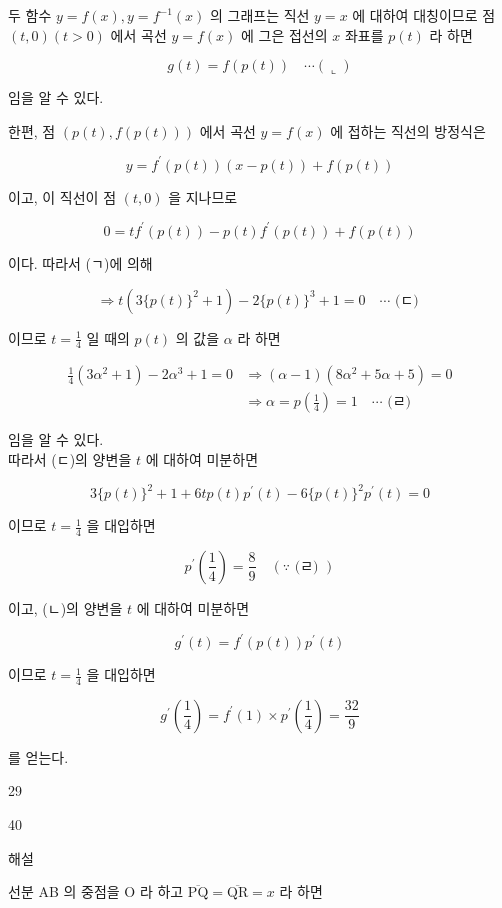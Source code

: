 \documentclass[10pt]{article}
\begin{document}
두 함수 \(y=f(x), y=f^{-1}(x)\) 의 그래프는 직선 \(y=x\) 에 대하여 대칭이므로 점 \((t, 0)(t>0)\) 에서 곡선 \(y=f(x)\) 에 그은 접선의 \(x\) 좌표를 \(p(t)\) 라 하면

\[
g(t)=f(p(t)) \quad \cdots(\llcorner)
\]

임을 알 수 있다.

한편, 점 \((p(t), f(p(t)))\) 에서 곡선 \(y=f(x)\) 에 접하는 직선의 방정식은

\[
y=f^{\prime}(p(t))(x-p(t))+f(p(t))
\]

이고, 이 직선이 점 \((t, 0)\) 을 지나므로

\[
0=t f^{\prime}(p(t))-p(t) f^{\prime}(p(t))+f(p(t))
\]

이다. 따라서 (ㄱ)에 의해

\[
\Rightarrow t\left(3\{p(t)\}^{2}+1\right)-2\{p(t)\}^{3}+1=0 \quad \cdots \text { (ㄷ) }
\]

이므로 \(t=\frac{1}{4}\) 일 때의 \(p(t)\) 의 값을 \(\alpha\) 라 하면

\[
\begin{aligned}
\frac{1}{4}\left(3 \alpha^{2}+1\right)-2 \alpha^{3}+1=0 & \Rightarrow(\alpha-1)\left(8 \alpha^{2}+5 \alpha+5\right)=0 \\
& \Rightarrow \alpha=p\left(\frac{1}{4}\right)=1 \quad \cdots \text { (ㄹ) }
\end{aligned}
\]

임을 알 수 있다.\\
따라서 (ㄷ)의 양변을 \(t\) 에 대하여 미분하면

\[
3\{p(t)\}^{2}+1+6 t p(t) p^{\prime}(t)-6\{p(t)\}^{2} p^{\prime}(t)=0
\]

이므로 \(t=\frac{1}{4}\) 을 대입하면

\[
p^{\prime}\left(\frac{1}{4}\right)=\frac{8}{9} \quad(\because \text { (ㄹ) })
\]

이고, (ㄴ)의 양변을 \(t\) 에 대하여 미분하면

\[
g^{\prime}(t)=f^{\prime}(p(t)) p^{\prime}(t)
\]

이므로 \(t=\frac{1}{4}\) 을 대입하면

\[
g^{\prime}\left(\frac{1}{4}\right)=f^{\prime}(1) \times p^{\prime}\left(\frac{1}{4}\right)=\frac{32}{9}
\]

를 얻는다.

29

40

해설

선분 AB 의 중점을 O 라 하고 \(\overline{\mathrm{PQ}}=\overline{\mathrm{QR}}=x\) 라 하면
\end{document}
